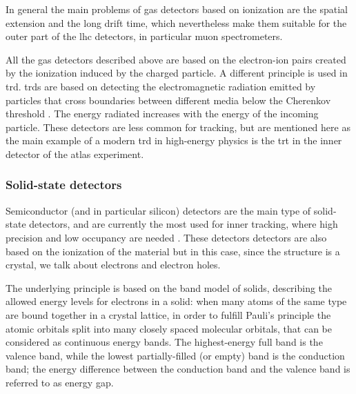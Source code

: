 In general the main problems of gas detectors based on ionization are the spatial extension and the long drift time, 
which nevertheless make them suitable for the outer part of the \gls{lhc} detectors, in particular muon spectrometers.

All the gas detectors described above are based on the electron-ion pairs created by the ionization induced by the charged particle. A different principle is used in \gls{trd}. \glspl{trd} are based on detecting the electromagnetic radiation emitted by particles that cross boundaries between different media below the Cherenkov threshold \cite{1402-4896-1982-T2A-024}. The energy radiated increases with the energy of the incoming particle. These detectors are less common for tracking, but are mentioned here as the main example of a modern \gls{trd} in high-energy physics is the \gls{trt} in the inner detector of the \gls{atlas} experiment.

\subsubsection*{Solid-state detectors}

Semiconductor (and in particular silicon) detectors are the main type of solid-state detectors, and are currently the most used for inner tracking, 
where high precision and low occupancy are needed \cite{Hartmann:2009zza}. 
These detectors detectors are also based on the ionization of the material but in this case, since the structure is a crystal, 
we talk about electrons and electron holes. 

The underlying principle is based on the band model of solids, describing the allowed energy levels for electrons in a solid: when many atoms of the same type are bound together in a crystal lattice, in order to fulfill Pauli's principle the atomic orbitals split into many closely spaced molecular orbitals, that can be considered as continuous energy bands. The highest-energy full band is the valence band, while the lowest partially-filled (or empty) band is the conduction band; the energy difference between the conduction band and the valence band is referred to as energy gap. 


